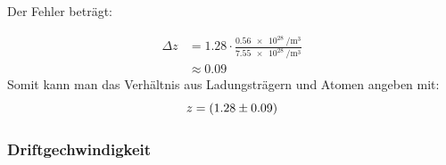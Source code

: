 Der Fehler beträgt:

\begin{align*}
\Delta z &= 1.28 \cdot \frac{\SI{0.56e28}{\per\cubic\meter}}{\SI{7.55e28}{\per\cubic\meter}}\\
&\approx 0.09
\end{align*}
Somit kann man das Verhältnis aus Ladungsträgern und Atomen angeben mit:
$$z = \SI{1.28 \pm 0.09}{}$$

\subsubsection{Driftgechwindigkeit}
